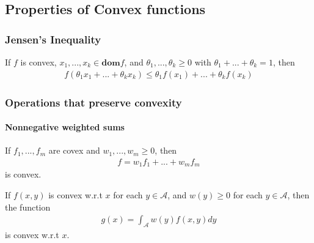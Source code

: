 \subsection{Properties of Convex functions}
\subsubsection{Jensen's Inequality}
\begin{theorem}
    If $f$ is convex, $x_1,..., x_k \in \mathbf{dom}f$,
    and $\theta_1,...,\theta_k \geq 0$ with
    $\theta_1 + ... + \theta_k = 1$, then
    \begin{align}
        f(\theta_1 x_1 + ... + \theta_k x_k)
        \leq \theta_1 f(x_1) + ... + \theta_k f(x_k)
    \end{align}
\end{theorem}

\subsubsection{Operations that preserve convexity}
\paragraph{Nonnegative weighted sums}
If $f_1,..., f_m$ are covex and $w_1,...,w_m \geq 0$,
then
\begin{align}
    f = w_1 f_1 + ... + w_m f_m
\end{align}
is convex.
\par
If $f(x, y)$ is convex w.r.t $x$ for each
$y \in \mathcal{A}$, and $w(y) \geq 0$ for each
$y \in \mathcal{A}$, then the function
\begin{align}
    g(x) = \int_{\mathcal{A}} w(y) f(x, y) dy
\end{align}
is convex w.r.t $x$.

